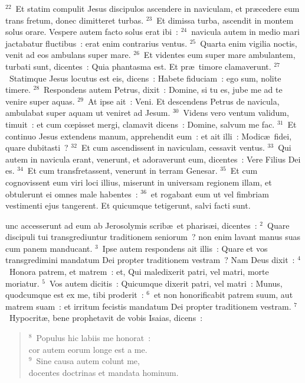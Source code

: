 ${}^{22}$~Et statim compulit Jesus discipulos ascendere in naviculam, et pr\ae cedere eum trans fretum, donec dimitteret turbas.
${}^{23}$~Et dimissa turba, ascendit in montem solus orare. Vespere autem facto solus erat ibi~:
${}^{24}$~navicula autem in medio mari jactabatur fluctibus~: erat enim contrarius ventus.
${}^{25}$~Quarta enim vigilia noctis, venit ad eos ambulans super mare.
${}^{26}$~Et videntes eum super mare ambulantem, turbati sunt, dicentes~: Quia phantasma est. Et pr\ae\ timore clamaverunt.
${}^{27}$~Statimque Jesus locutus est eis, dicens~: Habete fiduciam~: ego sum, nolite timere.
${}^{28}$~Respondens autem Petrus, dixit~: Domine, si tu es, jube me ad te venire super aquas.
${}^{29}$~At ipse ait~: Veni. Et descendens Petrus de navicula, ambulabat super aquam ut veniret ad Jesum.
${}^{30}$~Videns vero ventum validum, timuit~: et cum cœpisset mergi, clamavit dicens~: Domine, salvum me fac.
${}^{31}$~Et continuo Jesus extendens manum, apprehendit eum~: et ait illi~: Modic\ae\ fidei, quare dubitasti~?
${}^{32}$~Et cum ascendissent in naviculam, cessavit ventus.
${}^{33}$~Qui autem in navicula erant, venerunt, et adoraverunt eum, dicentes~: Vere Filius Dei es.
${}^{34}$~Et cum transfretassent, venerunt in terram Genesar.
${}^{35}$~Et cum cognovissent eum viri loci illius, miserunt in universam regionem illam, et obtulerunt ei omnes male habentes~:
${}^{36}$~et rogabant eum ut vel fimbriam vestimenti ejus tangerent. Et quicumque tetigerunt, salvi facti sunt.

\bchapter
{}unc accesserunt ad eum ab Jerosolymis scrib\ae\ et pharis\ae i, dicentes~:
${}^{2}$~Quare discipuli tui transgrediuntur traditionem seniorum~? non enim lavant manus suas cum panem manducant.
${}^{3}$~Ipse autem respondens ait illis~: Quare et vos transgredimini mandatum Dei propter traditionem vestram~? Nam Deus dixit~:
${}^{4}$~Honora patrem, et matrem~: et, Qui maledixerit patri, vel matri, morte moriatur.
${}^{5}$~Vos autem dicitis~: Quicumque dixerit patri, vel matri~: Munus, quodcumque est ex me, tibi proderit~:
${}^{6}$~et non honorificabit patrem suum, aut matrem suam~: et irritum fecistis mandatum Dei propter traditionem vestram.
${}^{7}$~Hypocrit\ae , bene prophetavit de vobis Isaias, dicens~:
\begin{flushleft}\begin{verse}${}^{8}$~Populus hic labiis me honorat~:\\ cor autem eorum longe est a me.\\
${}^{9}$~Sine causa autem colunt me,\\ docentes doctrinas et mandata hominum.\end{verse}\end{flushleft}


